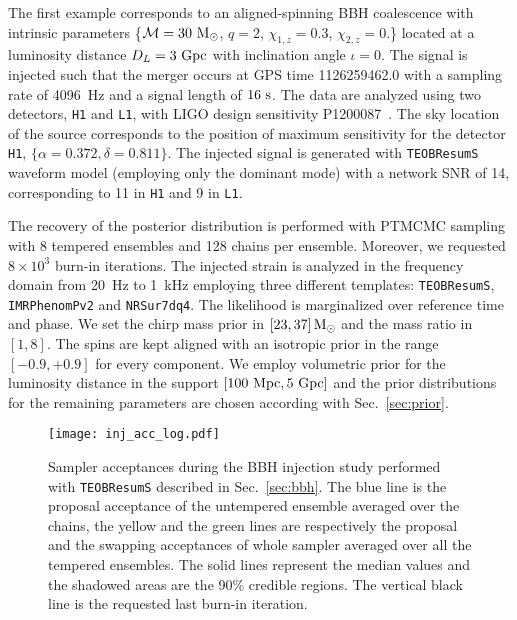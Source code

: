 \documentclass[prd,aps,twocolumn,a4paper,showkeys,nofootinbib,floatfix]{revtex4-1}
\def\M{\mathcal{M}}
\def\Mo{{\rm M_{\odot}}}
\begin{document}
The first example corresponds to an aligned-spinning BBH coalescence
with intrinsic parameters 
\{$\M = 30~\Mo$, $q=2$, $\chi_{1,z} = 0.3$, $\chi_{2,z} = 0.$\} 
located at a luminosity distance $D_L=3~{\rm Gpc}$ with inclination angle $\iota=0$.
The signal is injected such that the merger occurs at GPS time 1126259462.0
with a sampling rate of 4096~Hz and a signal length of
$16~{\rm s}$.
The data are analyzed using two detectors, {\tt H1} and {\tt L1}, with LIGO design sensitivity P1200087~\cite{TheLIGOScientific:2014jea,Aasi:2013wya,Harry:2010zz}.
The sky location of the source corresponds to the position of 
maximum sensitivity for the detector {\tt H1}, 
$\{\alpha=0.372, \delta=0.811\}$.
The injected signal is generated with {\tt TEOBResumS} waveform model
(employing only the dominant mode)
with a network SNR of 14, 
corresponding to 11 in {\tt H1} and 9 in {\tt L1}. 

The recovery of the posterior distribution is performed with PTMCMC sampling
with 8 tempered ensembles and 128 chains per ensemble.
Moreover, we requested $8{\times} 10^3$ burn-in iterations.
The injected strain is analyzed 
in the frequency domain from 20~Hz to 1~kHz
employing three different templates:
{\tt TEOBResumS}, {\tt IMRPhenomPv2} and {\tt NRSur7dq4}.
The likelihood is marginalized over reference time and phase.
We set the chirp mass prior in $[23, 37]\,\Mo$ and the mass ratio in $[1,8]$.
The spins are kept aligned with an isotropic prior in the range $[-0.9,+0.9]$ for every component.
We employ volumetric prior for the luminosity distance
in the support $[100~{\rm Mpc}, 5~{\rm Gpc}]$
and the prior distributions for the remaining parameters are chosen 
according with Sec.~\ref{sec:prior}.

\begin{figure}[t]
	\centering 
	\texttt{[image: inj\_acc\_log.pdf]}
	\caption{Sampler acceptances during the BBH injection study
		performed with {\tt TEOBResumS} described in Sec.~\ref{sec:bbh}.
		The blue line is the proposal acceptance of the  
		untempered ensemble averaged over the chains,
		the yellow and the green lines are 
		respectively
		the proposal and the swapping acceptances of whole sampler   
		averaged over all the tempered ensembles.
		The solid lines represent the median values 
		and the shadowed areas are the 90\% credible regions.
		The vertical black line is the requested last burn-in iteration.}
	\label{fig:inj_bbh_chain}
\end{figure}
\end{document}
